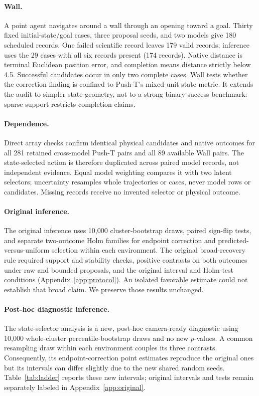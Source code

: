 \documentclass{article}
\begin{document}
\paragraph{Wall.}
A point agent navigates around a wall through an opening toward a goal.
Thirty fixed initial-state/goal cases, three proposal seeds, and two models
give 180 scheduled records. One failed scientific record leaves 179 valid
records; inference uses the 29 cases with all six records present (174 records).
Native distance is terminal Euclidean position error, and completion means
distance strictly below 4.5. Successful candidates occur in only two complete
cases. Wall tests whether the correction finding is confined to Push-T's mixed-unit
state metric. It extends the audit to simpler state geometry, not to a strong
binary-success benchmark: sparse support restricts completion claims.

\paragraph{Dependence.}
Direct array checks confirm identical physical candidates and native outcomes
for all 281 retained cross-model Push-T pairs and all 89 available Wall pairs.
The state-selected action is therefore duplicated across paired model records,
not independent evidence. Equal model weighting compares it with two latent
selectors; uncertainty resamples whole trajectories or cases, never model rows
or candidates. Missing records receive no invented selector or physical outcome.

\paragraph{Original inference.}
The original inference uses 10,000 cluster-bootstrap draws, paired sign-flip
tests, and separate two-outcome Holm families for endpoint correction and
predicted-versus-uniform selection within each environment. The original
broad-recovery rule required support and stability checks, positive contrasts
on both outcomes under raw and bounded proposals, and the original interval
and Holm-test conditions (Appendix~\ref{app:protocol}). An isolated favorable
estimate could not establish that broad claim. We preserve those results unchanged.

\paragraph{Post-hoc diagnostic inference.}
The state-selector analysis is a new, post-hoc camera-ready diagnostic using
10,000 whole-cluster percentile-bootstrap draws and no new $p$-values. A common
resampling draw within each environment couples its three contrasts.
Consequently, its endpoint-correction point estimates reproduce the original
ones but its intervals can differ slightly due to the new shared random seeds.
Table~\ref{tab:ladder} reports these new intervals; original intervals and tests
remain separately labeled in Appendix~\ref{app:original}.
\end{document}
